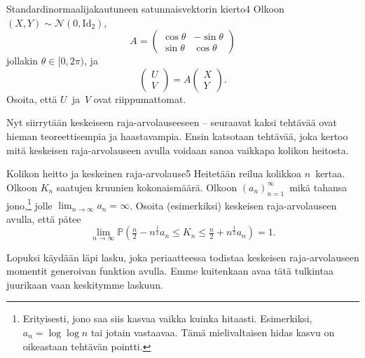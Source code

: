 \documentclass[11pt,a4paper]{amsart}
\newcommand{\1}{\mathbf{1}}
\renewcommand{\P}{\mathbb P}
\begin{document}
\begin{Exercises}{Standardinormaalijakautuneen satunnaisvektorin kierto}{4}
Olkoon $(X,Y)\sim \mathcal N(0,\mathrm{Id}_2)$, 
\[
A=\begin{pmatrix}
\cos \theta & -\sin \theta \\
\sin \theta & \cos \theta
\end{pmatrix}
\]
jollakin $\theta\in [0,2\pi)$, ja 
\[
\begin{pmatrix}
U\\
V
\end{pmatrix}=A\begin{pmatrix}
X\\
Y
\end{pmatrix}.
\]
Osoita, että $U$ ja $V$ ovat riippumattomat.

    
\end{Exercises}

Nyt siirrytään keskeiseen raja-arvolauseeseen -- seuraavat kaksi tehtävää ovat hieman teoreettisempia ja haastavampia. Ensin katsotaan tehtävää, joka kertoo mitä keskeisen raja-arvolauseen avulla voidaan sanoa vaikkapa kolikon heitosta. 

\begin{Exercises}{Kolikon heitto ja keskeinen raja-arvolause}{5}
Heitetään reilua kolikkoa $n$ kertaa. Olkoon $K_n$ saatujen kruunien kokonaismäärä. Olkoon $(a_n)_{n=1}^\infty$ mikä tahansa jono,\footnote{Erityisesti, jono saa siis kasvaa vaikka kuinka hitaasti. Esimerkiksi, $a_n=\log\log n$ tai jotain vastaavaa. Tämä mielivaltaisen hidas kasvu on oikeastaan tehtävän pointti.} jolle $\lim_{n\to\infty}a_n=\infty$. Osoita (esimerkiksi) keskeisen raja-arvolauseen avulla, että  pätee
\[
\lim_{n\to\infty}\P(\tfrac{n}{2}-n^{\frac{1}{2}}a_n\leq K_n\leq \tfrac{n}{2}+n^{\frac{1}{2}}a_n)=1.
\] 

    
\end{Exercises}

Lopuksi käydään läpi lasku, joka periaatteessa todistaa keskeisen raja-arvolauseen momentit generoivan funktion avulla. Emme kuitenkaan avaa tätä tulkintaa juurikaan vaan keskitymme laskuun.
\end{document}
